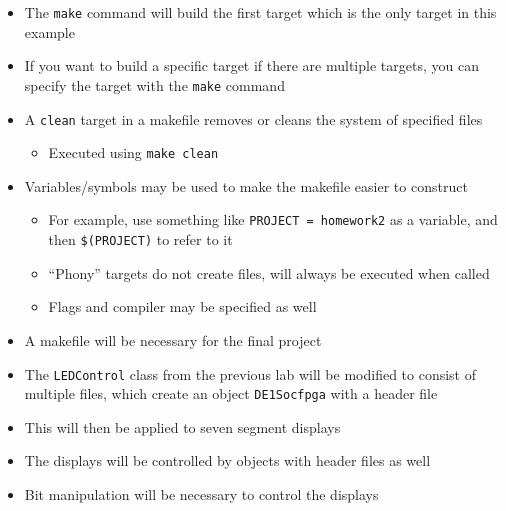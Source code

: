 \begin{itemize}
  \item The \texttt{make} command will build the first target which is the only target in this example

  \item If you want to build a specific target if there are multiple targets, you can specify the target with the \texttt{make} command

  \item A \texttt{clean} target in a makefile removes or cleans the system of specified files

    \begin{itemize}

      \item Executed using \texttt{make clean}

    \end{itemize}

  \item Variables/symbols may be used to make the makefile easier to construct

    \begin{itemize}

      \item For example, use something like \texttt{PROJECT = homework2} as a variable, and then \texttt{\$(PROJECT)} to refer to it

      \item ``Phony'' targets do not create files, will always be executed when called

      \item Flags and compiler may be specified as well

    \end{itemize}

  \item A makefile will be necessary for the final project

  \item The \texttt{LEDControl} class from the previous lab will be modified to consist of multiple files, which create an object \texttt{DE1Socfpga} with a header file

  \item This will then be applied to seven segment displays

  \item The displays will be controlled by objects with header files as well

  \item Bit manipulation will be necessary to control the displays

\end{itemize}



